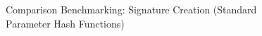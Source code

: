 \documentclass[]{final_report}
\begin{document}
\begin{figure}[H]
    \begin{minipage}{0.49\textwidth}
        \centering
       \caption{Comparison Benchmarking: Signature Creation (Standard Parameter Hash Functions)}
        \label{fig:image1}
    \end{minipage}
    \hfill %
    \begin{minipage}{0.49\textwidth}
        \centering

\end{minipage}
\end{figure}
\end{document}
